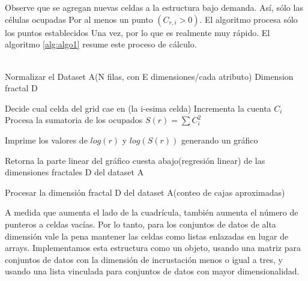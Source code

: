\\\\
Observe que se agregan nuevas celdas a la estructura bajo demanda. Así, sólo las células ocupadas
Por al menos un punto $(C_{r,i}> 0)$. El algoritmo procesa sólo los puntos establecidos
Una vez, por lo que es realmente muy rápido. El algoritmo \ref{alg:algo1} resume este proceso de cálculo.
\\\\
\begin{algorithm}
\begin{algorithmic}[1]
\REQUIRE Normalizar el Dataset A(N filas, con E dimensiones/cada atributo)
\label{lin:lineaRara}
\ENSURE  Dimension fractal D

    \STATE Decide cual celda del grid cae en (la i-esima celda)
    \STATE Incrementa la cuenta $C_i$
    \ENDFOR
    \STATE Procesa la sumatoria de los ocupados $S(r) = \sum C_i^2$
\ENDFOR

\STATE Imprime los valores de $log(r)$ y $log(S(r))$ generando un gráfico

\STATE Retorna la parte linear del gráfico cuesta abajo(regresión linear) de las dimensiones fractales D del dataset A

\end{algorithmic}
\caption{Procesar la dimensión fractal D del dataset A(conteo de cajas aproximadas)}
\label{alg:algo1}
\end{algorithm}
 
A medida que aumenta el lado de la cuadrícula, también aumenta el número de punteros a celdas vacías. Por lo tanto, para los conjuntos de datos de alta dimensión vale la pena mantener las celdas como listas enlazadas en lugar de arrays. Implementamos esta estructura como un objeto, usando una matriz para conjuntos de datos con la dimensión de incrustación menos o igual a tres, y usando una lista vinculada para conjuntos de datos con mayor dimensionalidad.	



